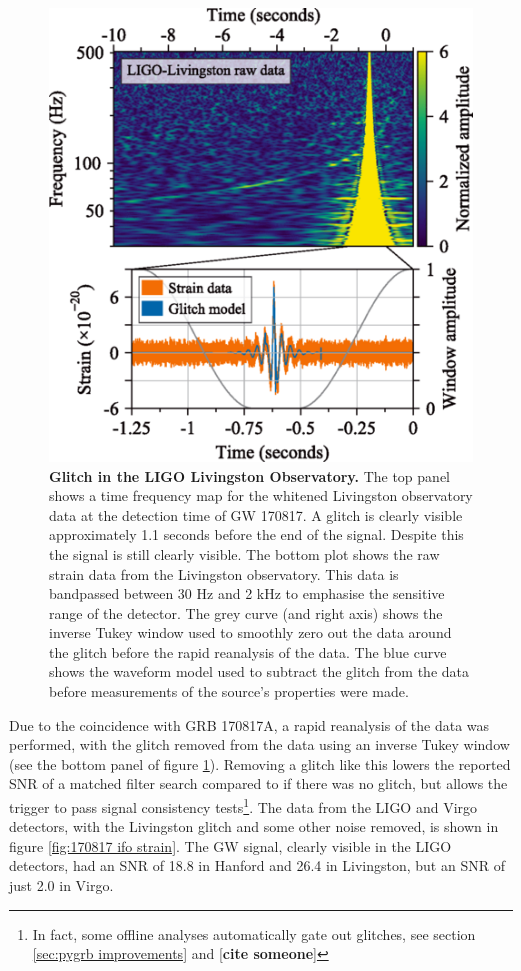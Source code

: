 \documentclass[11pt]{cuthesis}
\begin{document}
\begin{figure} %
\begin{center}
\includegraphics[width=0.8\linewidth]{l1_glitch.png}
\end{center}
\caption{\textbf{Glitch in the LIGO Livingston Observatory.} The top panel shows a time frequency map for the whitened Livingston observatory data at the detection time of GW 170817. A glitch is clearly visible approximately 1.1 seconds before the end of the signal. Despite this the signal is still clearly visible. The bottom plot shows the raw strain data from the Livingston observatory. This data is bandpassed between 30 Hz and 2 kHz to emphasise the sensitive range of the detector. The grey curve (and right axis) shows the inverse Tukey window used to smoothly zero out the data around the glitch before the rapid reanalysis of the data. The blue curve shows the waveform model used to subtract the glitch from the data before measurements of the source's properties were made. \cite{GW170817_det} }
\label{fig:l1 gltich}
\end{figure}

Due to the coincidence with GRB 170817A, a rapid reanalysis of the data was performed, with the glitch removed from the data using an inverse Tukey window (see the bottom panel of figure \ref{fig:l1 gltich}). Removing a glitch like this lowers the reported SNR of a matched filter search compared to if there was no glitch, but allows the trigger to pass signal consistency tests\footnote{In fact, some offline analyses automatically gate out glitches, see section \ref{sec:pygrb improvements} and [\textbf{cite someone}]}. The data from the LIGO and Virgo detectors, with the Livingston glitch and some other noise removed, is shown in figure \ref{fig:170817 ifo strain}. The GW signal, clearly visible in the LIGO detectors, had an SNR of 18.8 in Hanford and 26.4 in Livingston, but an SNR of just 2.0 in Virgo.
\end{document}
